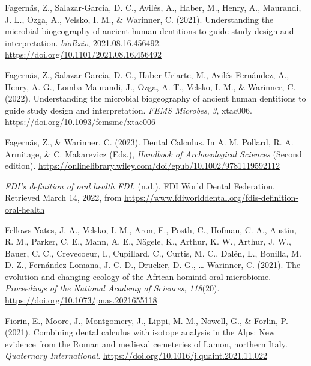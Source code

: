 \documentclass[
  letterpaper,
]{book}
\newlength{\cslhangindent}
\newlength{\cslentryspacingunit} %
\newenvironment{CSLReferences}[2] %
 {%
  \setlength{\parindent}{0pt}
  \ifodd #1
  \let\oldpar\par
  \def\par{\hangindent=\cslhangindent\oldpar}
  \fi
  \setlength{\parskip}{#2\cslentryspacingunit}
 }%
 {}
\begin{document}
\begin{CSLReferences}{1}{0}
\leavevmode{}%
Fagernäs, Z., Salazar-García, D. C., Avilés, A., Haber, M., Henry, A.,
Maurandi, J. L., Ozga, A., Velsko, I. M., \& Warinner, C. (2021).
Understanding the microbial biogeography of ancient human dentitions to
guide study design and interpretation. \emph{bioRxiv},
2021.08.16.456492. \url{https://doi.org/10.1101/2021.08.16.456492}

\leavevmode{}%
Fagernäs, Z., Salazar-García, D. C., Haber Uriarte, M., Avilés
Fernández, A., Henry, A. G., Lomba Maurandi, J., Ozga, A. T., Velsko, I.
M., \& Warinner, C. (2022). Understanding the microbial biogeography of
ancient human dentitions to guide study design and interpretation.
\emph{FEMS Microbes}, \emph{3}, xtac006.
\url{https://doi.org/10.1093/femsmc/xtac006}

\leavevmode{}%
Fagernäs, Z., \& Warinner, C. (2023). Dental {Calculus}. In A. M.
Pollard, R. A. Armitage, \& C. Makarevicz (Eds.), \emph{Handbook of
{Archaeological Sciences}} (Second edition).
\url{https://onlinelibrary.wiley.com/doi/epub/10.1002/9781119592112}

\leavevmode{}%
\emph{{FDI}'s definition of oral health \textbar{} {FDI}}. (n.d.). {FDI
World Dental Federation}. Retrieved March 14, 2022, from
\url{https://www.fdiworlddental.org/fdis-definition-oral-health}

\leavevmode{}%
Fellows Yates, J. A., Velsko, I. M., Aron, F., Posth, C., Hofman, C. A.,
Austin, R. M., Parker, C. E., Mann, A. E., Nägele, K., Arthur, K. W.,
Arthur, J. W., Bauer, C. C., Crevecoeur, I., Cupillard, C., Curtis, M.
C., Dalén, L., Bonilla, M. D.-Z., Fernández-Lomana, J. C. D., Drucker,
D. G., \ldots{} Warinner, C. (2021). The evolution and changing ecology
of the {African} hominid oral microbiome. \emph{Proceedings of the
National Academy of Sciences}, \emph{118}(20).
\url{https://doi.org/10.1073/pnas.2021655118}

\leavevmode{}%
Fiorin, E., Moore, J., Montgomery, J., Lippi, M. M., Nowell, G., \&
Forlin, P. (2021). Combining dental calculus with isotope analysis in
the {Alps}: {New} evidence from the {Roman} and medieval cemeteries of
{Lamon}, northern {Italy}. \emph{Quaternary International}.
\url{https://doi.org/10.1016/j.quaint.2021.11.022}


\end{CSLReferences}
\end{document}
